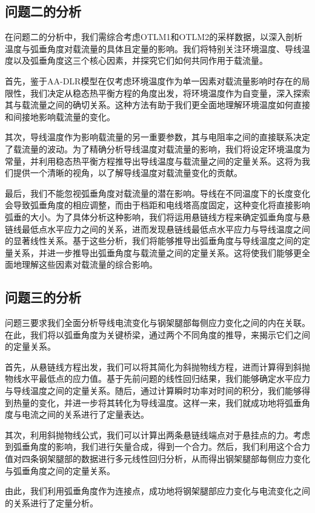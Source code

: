 \documentclass[a4paper,12.045pt]{ctexart}
\begin{document}
	\subsection{问题二的分析}
	在问题二的分析中，我们需综合考虑OTLM1和OTLM2的采样数据，以深入剖析温度与弧垂角度对载流量的具体且定量的影响。我们将特别关注环境温度、导线温度以及弧垂角度这三个核心因素，并探究它们如何共同作用于载流量。
	\par
  	首先，鉴于AA-DLR模型在仅考虑环境温度作为单一因素对载流量影响时存在的局限性，我们决定从稳态热平衡方程的角度出发，将环境温度作为自变量，深入探索其与载流量之间的确切关系。这种方法有助于我们更全面地理解环境温度如何直接和间接地影响载流量的变化。
	\par
	其次，导线温度作为影响载流量的另一重要参数，其与电阻率之间的直接联系决定了载流量的波动。为了精确分析导线温度对载流量的影响，我们将设定环境温度为常量，并利用稳态热平衡方程推导出导线温度与载流量之间的定量关系。这将为我们提供一个清晰的视角，以了解导线温度对载流量变化的贡献。
	\par
	最后，我们不能忽视弧垂角度对载流量的潜在影响。导线在不同温度下的长度变化会导致弧垂角度的相应调整，而由于档距和电线塔高度固定，这种变化将直接影响弧垂的大小。为了具体分析这种影响，我们将运用悬链线方程来确定弧垂角度与悬链线最低点水平应力之间的关系，进而发现悬链线最低点水平应力与导线温度之间的显著线性关系。基于这些分析，我们将能够推导出弧垂角度与导线温度之间的定量关系，并进一步推导出弧垂角度与载流量之间的定量关系。这将使我们能够更全面地理解这些因素对载流量的综合影响。
	\subsection{问题三的分析}
	问题三要求我们全面分析导线电流变化与钢架腿部每侧应力变化之间的内在关联。在此，我们将以弧垂角度为关键桥梁，通过两个不同角度的推导，来揭示它们之间的定量关系。
	\par
	首先，从悬链线方程出发，我们可以将其简化为斜抛物线方程，进而计算得到斜抛物线水平最低点的应力值。基于先前问题的线性回归结果，我们能够确定水平应力与导线温度之间的定量关系。随后，通过计算瞬时功率对时间的积分，我们能够得到热量的变化，并进一步将其转化为导线温度。这样一来，我们就成功地将弧垂角度与电流之间的关系进行了定量表达。
	\par
	其次，利用斜抛物线公式，我们可以计算出两条悬链线端点对于悬挂点的力。考虑到弧垂角度的影响，我们进行矢量合成，得到一个合力。然后，我们利用这个合力值对四条钢架腿部的数据进行多元线性回归分析，从而得出钢架腿部每侧应力变化与弧垂角度之间的定量关系。
	\par
	由此，我们利用弧垂角度作为连接点，成功地将钢架腿部应力变化与电流变化之间的关系进行了定量分析。
\end{document}

